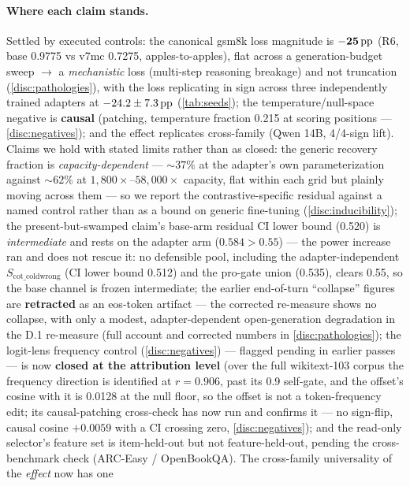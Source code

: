 \paragraph{Where each claim stands.}
Settled by executed controls: the canonical gsm8k loss magnitude is $\mathbf{-25\,\mathrm{pp}}$
(R6, base 0.9775 vs v7mc 0.7275, apples-to-apples), flat across a
generation-budget sweep $\rightarrow$ a \emph{mechanistic} loss (multi-step
reasoning breakage) and not truncation (\cref{disc:pathologies}), with the loss
replicating in sign across three independently trained adapters at
$-24.2 \pm 7.3\,\mathrm{pp}$ (\cref{tab:seeds}); the temperature/null-space negative is
\textbf{causal} (patching, temperature fraction 0.215 at scoring positions ---
\cref{disc:negatives}); and the effect replicates cross-family (Qwen 14B, 4/4-sign
lift). Claims we hold with stated limits rather than as closed: the generic recovery
fraction is \emph{capacity-dependent} --- ${\sim}37\%$ at the adapter's own
parameterization against ${\sim}62\%$ at $1{,}800\times$--$58{,}000\times$ capacity,
flat within each grid but plainly moving across them --- so we report the
contrastive-specific residual against a named control rather than as a bound on
generic fine-tuning (\cref{disc:inducibility}); the present-but-swamped claim's
base-arm residual CI lower bound
(0.520) is \emph{intermediate} and rests on the adapter arm ($0.584 > 0.55$) ---
the power increase ran and does not rescue it: no defensible pool, including the
adapter-independent $S_{\mathrm{cot\_coldwrong}}$ (CI lower bound 0.512) and the
pro-gate union (0.535), clears 0.55, so the base channel is frozen intermediate;
the earlier end-of-turn ``collapse'' figures are \textbf{retracted} as an eos-token
artifact --- the corrected re-measure shows no collapse, with only a modest,
adapter-dependent open-generation degradation in the D.1 re-measure (full account
and corrected numbers in \cref{disc:pathologies}); the logit-lens frequency control
(\cref{disc:negatives}) --- flagged pending in earlier passes --- is now
\textbf{closed at the attribution level} (over the full wikitext-103 corpus the
frequency direction is identified at $r{=}0.906$, past its 0.9 self-gate, and the
offset's cosine with it is 0.0128 at the null floor, so the offset is not a
token-frequency edit; its causal-patching cross-check has now run and confirms it
--- no sign-flip, causal cosine $+0.0059$ with a CI crossing zero,
\cref{disc:negatives}); and the read-only selector's feature set is item-held-out
but not feature-held-out, pending the cross-benchmark check (ARC-Easy /
OpenBookQA). The cross-family universality of the \emph{effect} now has one
